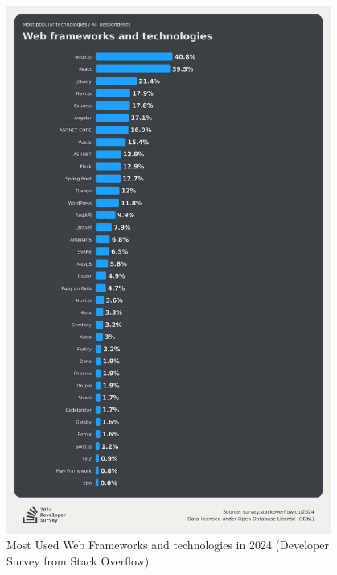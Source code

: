 \begin{figure}[htbp]
  \centering
  \includegraphics[width=0.95\textwidth]{gfx/figures/FrameworkSurvey2024.png}
  \caption{Most Used Web Frameworks and technologies in 2024 (Developer Survey from Stack Overflow) \cite{frontend:popularity}}
  \label{fig:methodology:popularFE}
\end{figure}

